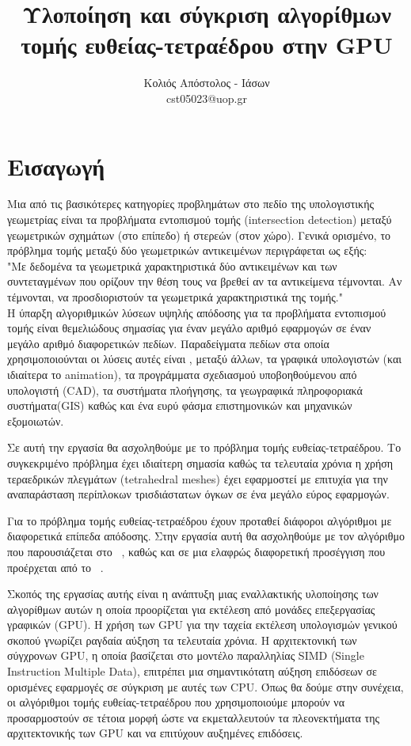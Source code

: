 \documentclass[a4paper,oneside,titlepage,12pt]{article}
\title{Υλοποίηση και σύγκριση αλγορίθμων τομής ευθείας-τετραέδρου στην GPU}
\author{Κολιός Απόστολος - Ιάσων\\cst05023@uop.gr}
\date{}
\begin{document}
\maketitle

\renewcommand{\contentsname}{Περιεχόμενα}
\tableofcontents


\section{Εισαγωγή}

Μια από τις βασικότερες κατηγορίες προβλημάτων στο πεδίο της υπολογιστικής γεωμετρίας είναι τα προβλήματα εντοπισμού τομής (intersection detection) μεταξύ γεωμετρικών σχημάτων (στο επίπεδο) ή στερεών (στον χώρο). Γενικά ορισμένο, το πρόβλημα τομής μεταξύ δύο γεωμετρικών αντικειμένων περιγράφεται ως εξής:
\\
"Με δεδομένα τα γεωμετρικά χαρακτηριστικά δύο αντικειμένων και των συντεταγμένων που ορίζουν την θέση τους να βρεθεί
αν τα αντικείμενα τέμνονται. Αν τέμνονται, να προσδιοριστούν τα γεωμετρικά χαρακτηριστικά της τομής."
\\
Η ύπαρξη αλγοριθμικών λύσεων υψηλής απόδοσης για τα προβλήματα εντοπισμού τομής είναι θεμελιώδους σημασίας για έναν μεγάλο αριθμό εφαρμογών 
σε έναν μεγάλο αριθμό διαφορετικών πεδίων. Παραδείγματα πεδίων στα οποία χρησιμοποιούνται οι λύσεις αυτές είναι , μεταξύ άλλων, τα γραφικά υπολογιστών (και ιδιαίτερα το animation), τα προγράμματα σχεδιασμού υποβοηθούμενου
από υπολογιστή (CAD), τα συστήματα πλοήγησης, τα γεωγραφικά πληροφοριακά συστήματα(GIS) καθώς και ένα ευρύ φάσμα επιστημονικών
και μηχανικών εξομοιωτών.

Σε αυτή την εργασία θα ασχοληθούμε με το πρόβλημα τομής ευθείας-τετραέδρου. Το συγκεκριμένο  πρόβλημα έχει ιδιαίτερη σημασία καθώς τα τελευταία χρόνια η χρήση τεραεδρικών πλεγμάτων (tetrahedral meshes) έχει εφαρμοστεί με επιτυχία για την αναπαράσταση περίπλοκων τρισδιάστατων όγκων σε ένα μεγάλο εύρος εφαρμογών.      

Για το πρόβλημα τομής ευθείας-τετραέδρου έχουν προταθεί διάφοροι αλγόριθμοι με διαφορετικά επίπεδα απόδοσης. Στην εργασία αυτή θα ασχοληθούμε με τον αλγόριθμο που παρουσιάζεται στο ~\cite{PlatisTheoharis03}, καθώς και σε μια ελαφρώς διαφορετική προσέγγιση που προέρχεται από το ~\cite{ericson2005real}.

Σκοπός της εργασίας αυτής είναι η ανάπτυξη μιας εναλλακτικής υλοποίησης των αλγορίθμων αυτών η οποία προορίζεται για εκτέλεση από μονάδες επεξεργασίας γραφικών (GPU). Η χρήση των GPU για την ταχεία εκτέλεση υπολογισμών γενικού σκοπού γνωρίζει ραγδαία αύξηση τα τελευταία χρόνια. Η αρχιτεκτονική των σύγχρονων GPU, η οποία βασίζεται στο μοντέλο παραλληλίας SIMD (Single Instruction Multiple Data), επιτρέπει μια σημαντικότατη αύξηση επιδόσεων σε ορισμένες εφαρμογές σε σύγκριση με αυτές των CPU.        Όπως θα δούμε στην συνέχεια, οι αλγόριθμοι τομής ευθείας-τετραέδρου που χρησιμοποιούμε μπορούν να προσαρμοστούν σε τέτοια μορφή ώστε να εκμεταλλευτούν τα πλεονεκτήματα της αρχιτεκτονικής των GPU και να επιτύχουν αυξημένες επιδόσεις.   
\end{document}
